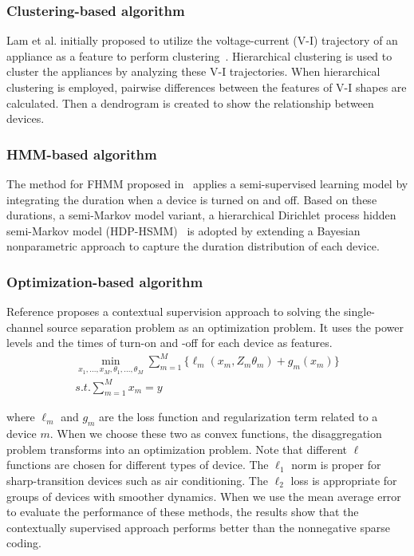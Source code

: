 \subsubsection{Clustering-based algorithm} 
Lam et al. initially proposed to utilize the voltage-current (V-I) trajectory of an appliance as 
a feature to perform clustering~\cite{lam2007novel}.  
Hierarchical clustering is used to cluster the appliances by
analyzing these V-I trajectories.
When hierarchical clustering is employed,
pairwise differences between the features of V-I shapes
are calculated.
Then a dendrogram is created to show the
relationship between devices. %


\subsubsection{HMM-based algorithm}
The method for FHMM proposed in~\cite{kim2011unsupervised} applies a semi-supervised learning model by integrating 
the duration when a device is turned on and off. 
Based on these durations, a semi-Markov model variant, a hierarchical Dirichlet 
process hidden semi-Markov model (HDP-HSMM)~\cite{johnson2012bayesian} 
is adopted by extending a Bayesian nonparametric approach to capture the 
duration distribution of each device. 
 
\subsubsection{Optimization-based algorithm}
Reference \cite{wytock2014contextually} proposes a contextual supervision approach to 
solving the single-channel source separation problem as an optimization problem. 
It uses the power levels and the times of turn-on and -off for each device as features. 
\begin{equation}
\begin{aligned}
\min_{x_1,...,x_M, \theta_1, ..., \theta_M} \sum_{m=1}^{M} \{ \ell_m(x_m, Z_m\theta_m)+g_m(x_m) \} \\
s.t. \sum_{m=1}^{M}x_m=y
\end{aligned}
\end{equation}

where $\ell_m$ and $g_m$ are the loss function and regularization term related to a device $m$. 
When we choose these two as convex functions, the disaggregation problem 
transforms into an optimization problem. 
Note that different $\ell$ functions are chosen for different types of device. 
The $\ell_1$ norm is proper for sharp-transition devices such as air conditioning. 
The $\ell_2$ loss is appropriate for groups of devices with smoother dynamics. 
When we use the mean average error to evaluate the performance of these methods, the results show 
that the contextually supervised approach performs better than the nonnegative sparse coding. 

